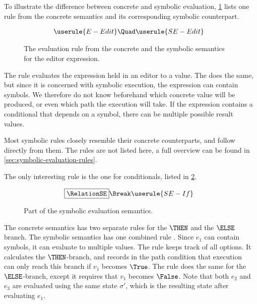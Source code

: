 To illustrate the difference between concrete and symbolic evaluation, \cref{fig:oldToNewSemantics} lists one rule from the concrete semantics and its corresponding symbolic counterpart.

\begin{figure}[ht]
  \small
  \begin{gather*}
    \userule{E-Edit}\Quad
    \userule{SE-Edit}
  \end{gather*}
  \caption{The evaluation rule from the concrete and the symbolic semantics for the editor expression.}
  \label{fig:oldToNewSemantics}
\end{figure}

The  rule evaluates the expression held in an editor to a value.
The  does the same, but since it is concerned with symbolic execution, the expression can contain symbols.
We therefore do not know beforehand which concrete value will be produced, or even which path the execution will take.
If the expression contains a conditional that depends on a symbol, there can be multiple possible result values.


Most symbolic rules closely resemble their concrete counterparts, and follow directly from them.
The rules are not listed here, a full overview can be found in \cref{sec:symbolic-evaluation-rules}.

The only interesting rule is the one for conditionals, listed in \cref{fig:eval}.
\begin{figure}[ht]
  \small
  \begin{gather*}
    \boxed{\RelationSE} \Break
    \userule{SE-If}
  \end{gather*}
  \caption{Part of the symbolic evaluation semantics.}
  \label{fig:eval}
\end{figure}
The concrete semantics has two separate rules for the $\THEN$ and the $\ELSE$ branch.
The symbolic semantics has one combined rule .
Since $e_1$ can contain symbols, it can evaluate to multiple values.
The rule keeps track of all options.
It calculates the $\THEN$-branch, and records in the path condition that execution can only reach this branch if $v_1$ becomes $\True$.
The rule does the same for the $\ELSE$-branch, except it requires that $v_1$ becomes $\False$.
Note that both $e_2$ and $e_3$ are evaluated using the same state $\sigma'$,
which is the resulting state after evaluating $e_1$.



